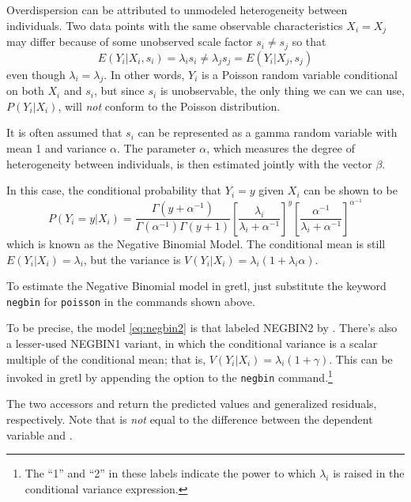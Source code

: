 Overdispersion can be attributed to unmodeled heterogeneity between
individuals. Two data points with the same observable characteristics
$X_i = X_j$ may differ because of some unobserved scale factor $s_i
\ne s_j$ so that
\[
   E(Y_i | X_i, s_i) = \lambda_i s_i \ne \lambda_j s_j = E(Y_i | X_j, s_j)
\]
even though $\lambda_i = \lambda_j$. In other words, $Y_i$ is a
Poisson random variable conditional on both $X_i$ and $s_i$, but since
$s_i$ is unobservable, the only thing we can we can use,
$P(Y_i | X_i)$, will \textit{not} conform to the Poisson distribution.

It is often assumed that $s_i$ can be represented as a gamma random
variable with mean 1 and variance $\alpha$. The parameter $\alpha$,
which measures the degree of heterogeneity between individuals, is
then estimated jointly with the vector $\beta$.

In this case, the conditional probability that $Y_i = y$ given $X_i$
can be shown to be
  \begin{equation}
    \label{eq:negbin2}
  P(Y_i = y | X_i) = 
  \frac{\Gamma(y + \alpha^{-1})}{\Gamma(\alpha^{-1})\Gamma(y + 1)}
  \left[ \frac{\lambda_i} {\lambda_i + \alpha^{-1} }\right]^{y}
  \left[ \frac{\alpha^{-1}} {\lambda_i + \alpha^{-1} }\right]^{\alpha^{-1}}
\end{equation}
which is known as the Negative Binomial Model. The conditional
mean is still $E(Y_i | X_i) = \lambda_i$, but the variance is $V(Y_i |
X_i) = \lambda_i \left( 1 + \lambda_i \alpha \right)$.

To estimate the Negative Binomial model in gretl, just substitute the
keyword \texttt{negbin} for \texttt{poisson} in the commands shown
above.

To be precise, the model \ref{eq:negbin2} is that labeled NEGBIN2 by
\cite{cameron-trivedi86}. There's also a lesser-used NEGBIN1 variant,
in which the conditional variance is a scalar multiple of the
conditional mean; that is,
$V(Y_i | X_i) = \lambda_i \left( 1 + \gamma \right)$. This can be
invoked in gretl by appending the option  to the
\texttt{negbin} command.\footnote{The ``1'' and ``2'' in these labels
  indicate the power to which $\lambda_i$ is raised in the conditional
  variance expression.}

The two accessors  and  return the predicted
values and generalized residuals, respectively. Note that
 is \emph{not} equal to the difference between the
dependent variable and .

